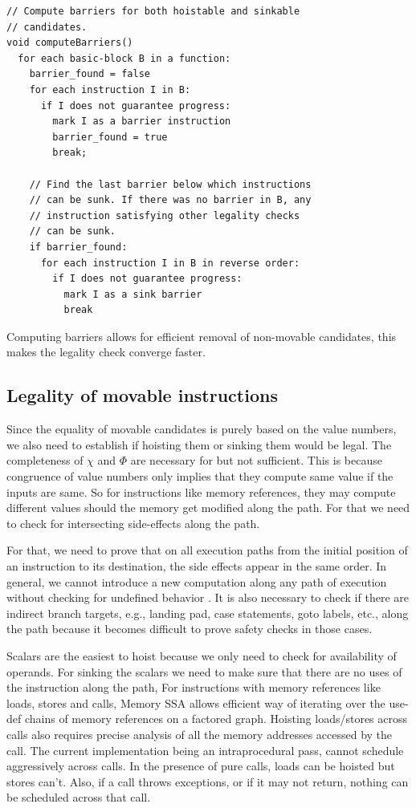 \documentclass[sigplan,10pt,review,anonymous]{acmart}\settopmatter{printfolios=true,printccs=false,printacmref=false}
\begin{document}
\begin{lstlisting}
// Compute barriers for both hoistable and sinkable
// candidates.
void computeBarriers()
  for each basic-block B in a function:
    barrier_found = false
    for each instruction I in B:
      if I does not guarantee progress:
        mark I as a barrier instruction
        barrier_found = true
        break;

    // Find the last barrier below which instructions
    // can be sunk. If there was no barrier in B, any
    // instruction satisfying other legality checks
    // can be sunk.
    if barrier_found:
      for each instruction I in B in reverse order:
        if I does not guarantee progress:
          mark I as a sink barrier
          break
\end{lstlisting}

Computing barriers allows for efficient removal of non-movable candidates, this
makes the legality check converge faster.

\subsection{Legality of movable instructions}
\label{subsec:legality}
Since the equality of movable candidates is purely based on the value numbers,
we also need to establish if hoisting them or sinking them would be legal. The
completeness of $\chi$ and $\Phi$ are necessary for \GCM{} but not
sufficient. This is because congruence of value numbers only implies that they
compute same value if the inputs are same. So for instructions like memory
references, they may compute different values should the memory get modified
along the path. For that we need to check for intersecting side-effects along
the path.

For that, we need to prove that on all execution paths from the initial position
of an instruction to its destination, the side effects appear in the same
order. In general, we cannot introduce a new computation along any path of
execution without checking for undefined behavior \cite{undef}. It is also
necessary to check if there are indirect branch targets, e.g., landing pad, case
statements, goto labels, etc., along the path because it becomes difficult to
prove safety checks in those cases.

Scalars are the easiest to hoist because we only need to check for availability
of operands. For sinking the scalars we need to make sure that there are no uses
of the instruction along the path, For instructions with memory references like
loads, stores and calls, Memory SSA allows efficient way of iterating over the
use-def chains of memory references on a factored graph. Hoisting loads/stores
across calls also requires precise analysis of all the memory addresses accessed
by the call. The current implementation being an intraprocedural pass, cannot
schedule aggressively across calls. In the presence of pure calls, loads can be
hoisted but stores can't. Also, if a call throws exceptions, or if it may not
return, nothing can be scheduled across that call.
\end{document}
